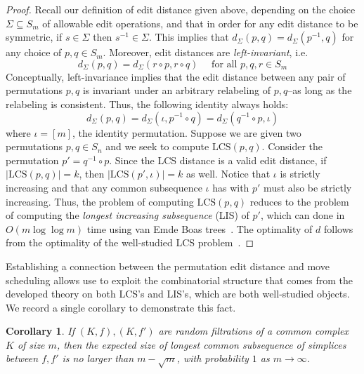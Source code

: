 \documentclass[sn-mathphys]{sn-jnl}
\newtheorem{corollary}{Corollary}
\begin{document}
\begin{proof} \normalsize
Recall our definition of  edit distance given above, 
depending on the choice   $\Sigma \subseteq S_m$ of allowable edit operations, and that in order for any edit distance to be symmetric, if $s \in \Sigma$ then $s^{-1} \in \Sigma$. This implies that $d_\Sigma(p,q) = d_\Sigma(p^{-1}, q)$ for any choice of  $p,q \in S_m$. 
Moreover, edit distances are \emph{left-invariant}, i.e.
\[
d_\Sigma(p,q) = d_\Sigma(r \circ p, r \circ q) \quad \text{ for all } p,q,r \in S_m
\]
Conceptually, left-invariance implies that the edit distance between any pair of permutations $p,q$ is invariant under an arbitrary relabeling of $p,q$--as long as the relabeling is consistent. Thus, the following identity always holds: 
$$ d_\Sigma(p,q) = d_\Sigma(\iota, p^{-1} \circ q) = d_\Sigma(q^{-1} \circ p, \iota) $$
where $\iota = [m]$, the identity permutation. Suppose we are given two permutations $p, q \in S_n$ and we seek to compute $\mathrm{LCS}(p, q)$. Consider the permutation $p' = q^{-1} \circ p$. Since the LCS distance is a valid edit distance, if $\lvert \mathrm{LCS}(p, q) \rvert = k$, then $\lvert \mathrm{LCS}(p', \iota) \rvert = k$ as well. Notice that $\iota$ is strictly increasing and that any common subsequence $\iota$ has with $p'$ must also be strictly increasing. Thus, the problem of computing $\mathrm{LCS}(p, q)$ reduces to the problem of computing the \emph{longest increasing subsequence} (LIS) of $p'$, which can done in $O( m \log \log m)$ time using van Emde Boas trees~\cite{bespamyatnikh2000enumerating}. The optimality of $d$ follows from the optimality of the well-studied LCS problem~\cite{kumar1987linear}. 
\end{proof}
\noindent
Establishing a connection between the permutation edit distance and move scheduling allows use to exploit the combinatorial structure that comes from the developed theory on both LCS's and LIS's, which are both well-studied objects. We record a single corollary to demonstrate this fact. 
\begin{corollary}\label{cor:expectation}
If $(K, f), (K,f')$ are random filtrations of a common complex $K$ of size $m$, then the expected size of longest common subsequence of simplices between $f,f'$ is no larger than $m - \sqrt{m}$, with probability $1$ as $m \to \infty$.
\end{corollary}
\end{document}
